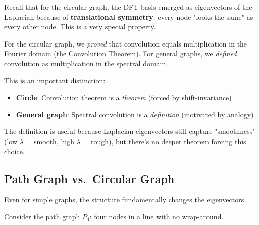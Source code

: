 \begin{notechapter}
Recall that for the circular graph, the DFT basis emerged as 
eigenvectors of the Laplacian because of \textbf{translational 
symmetry}: every node "looks the same" as every other node. This is 
a very special property.

\begin{remark}
For the circular graph, we \emph{proved} that convolution equals 
multiplication in the Fourier domain (the Convolution Theorem). For 
general graphs, we \emph{defined} convolution as multiplication in 
the spectral domain.

This is an important distinction:
\begin{itemize}
    \item \textbf{Circle}: Convolution theorem is a \emph{theorem} 
          (forced by shift-invariance)
    \item \textbf{General graph}: Spectral convolution is a 
          \emph{definition} (motivated by analogy)
\end{itemize}

The definition is useful because Laplacian eigenvectors still capture 
"smoothness" (low $\lambda$ = smooth, high $\lambda$ = rough), but 
there's no deeper theorem forcing this choice.
\end{remark}

\subsection{Path Graph vs.\ Circular Graph}

Even for simple graphs, the structure fundamentally changes the 
eigenvectors.

\begin{example}
Consider the path graph $P_4$: four nodes in a line with no wrap-around.

\begin{center}
\end{center}


\end{example}
\end{notechapter}
